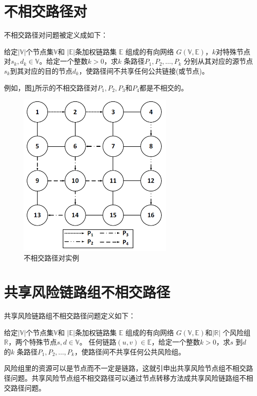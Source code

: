 \section{不相交路径对}
不相交路径对问题被定义成如下：

\begin{definition}[不相交路径对]
给定$|\mathbb{V}|$个节点集$\mathbb{V}$和 $|\mathbb{E}|$条加权链路集 $\mathbb{E}$ 组成的有向网络 $G(\mathbb{V},\mathbb{E})$，$k$对特殊节点对$s_k,d_k\in\mathbb{V}$。给定一个整数$k>0$，求$k$ 条路径$P_1,P_2,\ldots,P_k$ 分别从其对应的源节点$s_k$到其对应的目的节点$d_k$，使路径间不共享任何公共链接(或节点)。
\end{definition}
例如，图\ref{fig:DisjointPathPairs}所示的不相交路径对$P_1,P_2,P_3$和$P_4$都是不相交的。
\begin{figure}[htbp]
  \centering
  \includegraphics[width=3.0in]{figures/DisjointPathPairs}
  \caption{不相交路径对实例}
  \label{fig:DisjointPathPairs}
\end{figure}
\section{共享风险链路组不相交路径}






共享风险链路组不相交路径问题定义如下：

\begin{definition}[共享风险链路组不相交路径问题]
给定$|\mathbb{V}|$个节点集$\mathbb{V}$和 $|\mathbb{E}|$条加权链路集 $\mathbb{E}$ 组成的有向网络 $G(\mathbb{V},\mathbb{E})$和$|\mathbb{R}|$ 个风险组$\mathbb{R}$，两个特殊节点$s,d\in\mathbb{V}$。 任何链路$(u,v)\in\mathbb{E}$，给定一个整数$k>0$，求$s$ 到$d$ 的$k$ 条路径$P_1,P_2,\ldots,P_k$，使路径间不共享任何公共风险组。
\end{definition}
风险组里的资源可以是节点而不一定是链路，这就引申出共享风险节点组不相交路径问题。共享风险节点组不相交路径可以通过节点转移方法成共享风险链路组不相交路径问题。

